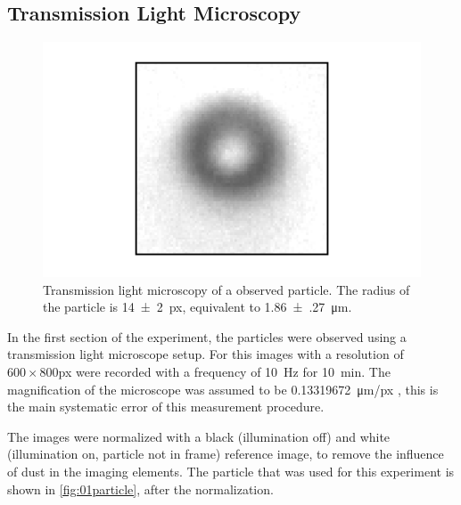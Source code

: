 \documentclass[
    parskip=half, 
    twoside=false,
    twocolumn=true,
    fontsize=11pt,
]{scrarticle}
\begin{document}
\subsection{Transmission Light Microscopy}
\begin{figure}
    \centering
    \includegraphics{figures/01_01_1_particle.pdf}
    \caption{Transmission light microscopy of a observed particle. The radius of the particle is \SI{14(2)}{px}, equivalent to \SI{1.86(27)}{\micro m}.}
    \label{fig:01particle}
\end{figure}
In the first section of the experiment, the particles were observed using a transmission light microscope setup.
For this images with a resolution of $600\times 800$\si{px} were recorded with a frequency of \SI{10}{Hz} for \SI{10}{min}.
The magnification of the microscope was assumed to be \SI{0.13319672}{\micro m/px} \cite{instructions}, this is the main systematic error of this measurement procedure.

The images were normalized with a black (illumination off) and white (illumination on, particle not in frame) reference image, to remove the influence of dust in the imaging elements.
The particle that was used for this experiment is shown in \autoref{fig:01particle}, after the normalization.
\end{document}
